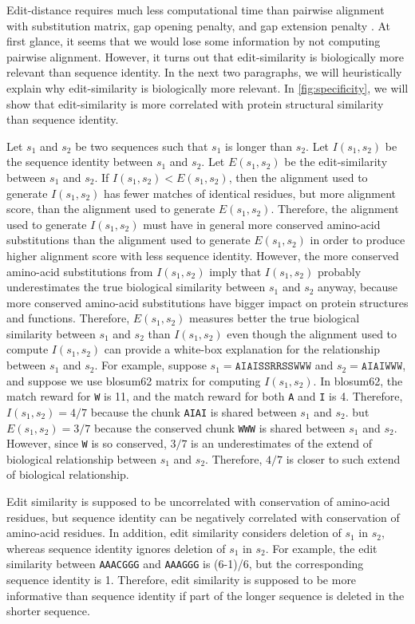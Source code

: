 \documentclass[11pt,letterpaper]{article}
\begin{document}
Edit-distance requires much less computational time than pairwise alignment with substitution matrix, gap opening penalty, and gap extension penalty \cite{vsovsic2017edlib}. 
At first glance, it seems that we would lose some information by not computing pairwise alignment. 
However, it turns out that edit-similarity is biologically more relevant than sequence identity.
In the next two paragraphs, we will heuristically explain why edit-similarity is biologically more relevant.
In \ref{fig:specificity}, we will show that edit-similarity is more correlated with protein structural similarity than sequence identity.

Let \(s_1\) and \(s_2\) be two sequences such that \(s_1\) is longer than \(s_2\).
Let \(I(s_1, s_2)\) be the sequence identity between \(s_1\) and \(s_2\).
Let \(E(s_1, s_2)\) be the edit-similarity between \(s_1\) and \(s_2\).
If \(I(s_1, s_2) < E(s_1, s_2)\), then the alignment used to generate \(I(s_1, s_2)\) has fewer matches of identical residues, but more alignment score, than the alignment used to generate \(E(s_1, s_2)\).
Therefore, the alignment used to generate \(I(s_1, s_2)\) must have in general more conserved amino-acid substitutions than the alignment used to generate \(E(s_1, s_2)\) in order to produce higher alignment score with less sequence identity.
However, the more conserved amino-acid substitutions from \(I(s_1, s_2)\) imply that \(I(s_1, s_2)\) probably underestimates the true biological similarity between \(s_1\) and \(s_2\) anyway, because more conserved amino-acid substitutions have bigger impact on protein structures and functions.
Therefore, \(E(s_1, s_2)\) measures better the true biological similarity between \(s_1\) and \(s_2\) than \(I(s_1, s_2)\) even though the alignment used to compute \(I(s_1, s_2)\) can provide a white-box explanation for the relationship between \(s_1\) and \(s_2\).
For example, suppose \(s_1 = \texttt{AIAISSRRSSWWW}\) and \(s_2 = \texttt{AIAIWWW}\), 
and suppose we use blosum62 matrix for computing \(I(s_1, s_2)\).
In blosum62, the match reward for \texttt{W} is 11, and the match reward for both \texttt{A} and \texttt{I} is 4.
Therefore, \(I(s_1, s_2) = 4/7\) because the           chunk \texttt{AIAI} is shared between \(s_1\) and \(s_2\).
but \(E(s_1, s_2) = 3/7\) because the conserved chunk \texttt{WWW}  is shared between \(s_1\) and \(s_2\).
However, since \texttt{W} is so conserved, \(3/7\) is an underestimates of the extend of biological relationship between \(s_1\) and \(s_2\).
Therefore, \(4/7\) is closer to such extend of biological relationship.

Edit similarity is supposed to be uncorrelated with conservation of amino-acid residues, but sequence identity can be negatively correlated with conservation of amino-acid residues.
In addition, edit similarity considers deletion of \(s_1\) in \(s_2\), whereas sequence identity ignores deletion of \(s_1\) in \(s_2\).
For example, the edit similarity between \texttt{AAACGGG} and \texttt{AAAGGG} is (6-1)/6, but the corresponding sequence identity is 1. Therefore, edit similarity is supposed to be more informative than sequence identity if part of the longer sequence is deleted in the shorter sequence.

\fi
\end{document}
